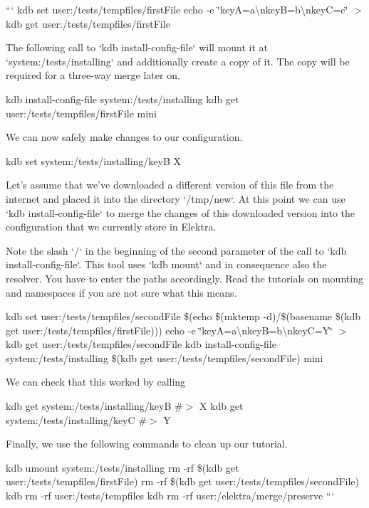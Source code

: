 ``` kdb set user\+:/tests/tempfiles/first\+File  echo -\/e \char`\"{}key\+A=a\textbackslash{}nkey\+B=b\textbackslash{}nkey\+C=c\char`\"{} $>$ {\ttfamily kdb get user\+:/tests/tempfiles/first\+File} 
\begin{DoxyCode}
The following call to `kdb install-config-file` will mount it at `system:/tests/installing` and
       additionally create a copy of it.
The copy will be required for a three-way merge later on.
\end{DoxyCode}
 kdb install-\/config-\/file system\+:/tests/installing {\ttfamily kdb get user\+:/tests/tempfiles/first\+File} mini 
\begin{DoxyCode}
We can now safely make changes to our configuration.
\end{DoxyCode}
 kdb set system\+:/tests/installing/keyB X 
\begin{DoxyCode}
Let's assume that we've downloaded a different version of this file from the internet and placed it into
       the directory `/tmp/new`.
At this point we can use `kdb install-config-file` to merge the changes of this downloaded version into the
       configuration that we currently store in Elektra.

Note the slash `/` in the beginning of the second parameter of the call to `kdb install-config-file`.
This tool uses `kdb mount` and in consequence also the resolver.
You have to enter the paths accordingly.
Read the tutorials on mounting and namespaces if you are not sure what this means.
\end{DoxyCode}
 kdb set user\+:/tests/tempfiles/second\+File \$(echo \$(mktemp -\/d)/\$(basename \$(kdb get user\+:/tests/tempfiles/first\+File))) echo -\/e \char`\"{}key\+A=a\textbackslash{}nkey\+B=b\textbackslash{}nkey\+C=\+Y\char`\"{} $>$ {\ttfamily kdb get user\+:/tests/tempfiles/second\+File} kdb install-\/config-\/file system\+:/tests/installing \$(kdb get user\+:/tests/tempfiles/second\+File) mini 
\begin{DoxyCode}
We can check that this worked by calling
\end{DoxyCode}
 kdb get system\+:/tests/installing/keyB \#$>$ X kdb get system\+:/tests/installing/keyC \#$>$ Y 
\begin{DoxyCode}
Finally, we use the following commands to clean up our tutorial.
\end{DoxyCode}
 kdb umount system\+:/tests/installing rm -\/rf \$(kdb get user\+:/tests/tempfiles/first\+File) rm -\/rf \$(kdb get user\+:/tests/tempfiles/second\+File) kdb rm -\/rf user\+:/tests/tempfiles kdb rm -\/rf user\+:/elektra/merge/preserve ``` 